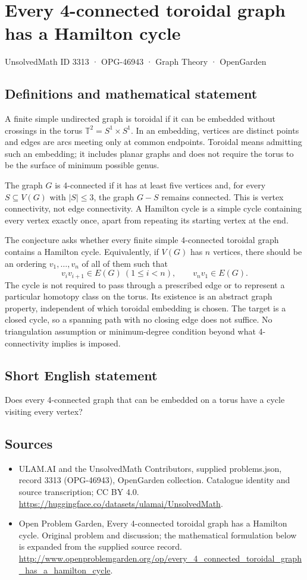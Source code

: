 \documentclass[11pt,a4paper]{article}
\begin{document}
\section*{Every 4-connected toroidal graph has a Hamilton cycle}\label{3313}
{\small UnsolvedMath ID 3313 · OPG-46943 · Graph Theory · OpenGarden}
\subsection{Definitions and mathematical statement}
A finite simple undirected graph is toroidal if it can be embedded
without crossings in the torus $\mathbb T^2=S^1\times S^1$. In an
embedding, vertices are distinct points and edges are arcs meeting
only at common endpoints. Toroidal means admitting such an embedding;
it includes planar graphs and does not require the torus to be the
surface of minimum possible genus.

The graph $G$ is 4-connected if it has at least five vertices and,
for every $S\subseteq V(G)$ with $|S|\le3$, the graph $G-S$ remains
connected. This is vertex connectivity, not edge connectivity. A
Hamilton cycle is a simple cycle containing every vertex exactly
once, apart from repeating its starting vertex at the end.

The conjecture asks whether every finite simple 4-connected toroidal
graph contains a Hamilton cycle. Equivalently, if $V(G)$ has $n$
vertices, there should be an ordering $v_1,\ldots,v_n$ of all of them
such that
\[
                  v_iv_{i+1}\in E(G)\ (1\le i<n),
                  \qquad v_nv_1\in E(G).
\]
The cycle is not required to pass through a prescribed edge or to
represent a particular homotopy class on the torus. Its existence is
an abstract graph property, independent of which toroidal embedding
is chosen. The target is a closed cycle, so a spanning path with no
closing edge does not suffice. No triangulation assumption or
minimum-degree condition beyond what 4-connectivity implies is imposed.
\subsection{Short English statement}
Does every 4-connected graph that can be embedded on a torus have a cycle visiting every vertex?
\subsection{Sources}
\begin{itemize}
\item[S1] ULAM.AI and the UnsolvedMath Contributors, supplied problems.json, record 3313 (OPG-46943), OpenGarden collection. Catalogue identity and source transcription; CC BY 4.0.
\url{https://huggingface.co/datasets/ulamai/UnsolvedMath}.
\item[S2] Open Problem Garden, Every 4-connected toroidal graph has a Hamilton cycle. Original problem and discussion; the mathematical formulation below is expanded from the supplied source record.
\url{http://www.openproblemgarden.org/op/every_4_connected_toroidal_graph_has_a_hamilton_cycle}.
\end{itemize}
\end{document}
